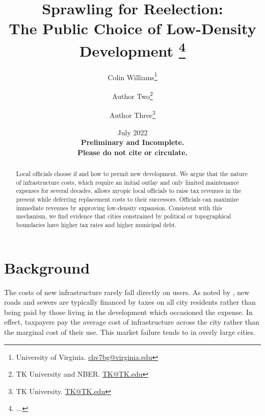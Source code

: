 \documentclass[12pt]{article}
\title{ \vspace*{-2.5cm} \hspace*{-0.5cm}Sprawling for Reelection: \\ The Public Choice of Low-Density Development \footnote{
...
}}
\author{Colin Williams\thanks{University of Virginia.
\href{mailto:chv7bg@virginia.edu}{chv7bg@virginia.edu}} \and Author Two\thanks{TK University and
NBER.  \href{mailto:TK@TK.edu}{TK@TK.edu}} \and Author Three\thanks{TK
University. \href{mailto:TK@TK.edu}{TK@TK.edu}}}
\date{ \vspace*{0.5cm} July 2022 \\
\textbf{Preliminary and Incomplete. \\ Please do not cite or circulate.}
}
\begin{document}
\bgroup
\let\footnoterule\relax

\begin{singlespace}
\maketitle


\begin{abstract}
    \noindent Local officials choose if and how to permit new development. We argue that the nature of infrastructure costs, which require an initial outlay and only limited maintenance expenses for several decades, allows myopic local officials to raise tax revenues in the present while deferring replacement costs to their successors. Officials can maximize immediate revenues by approving low-density expansion. Consistent with this mechanism, we find evidence that cities constrained by political or topographical boundaries have higher tax rates and higher municipal debt.
\end{abstract}
\end{singlespace}
\thispagestyle{empty}

\clearpage
\egroup
\setcounter{page}{1}



\noindent %


\section{Background \label{sec:background}}

The costs of new infrastructure rarely fall directly on users. As noted by \citet{brueckner2000urban}, new roads and sewers are typically financed by taxes on all city residents rather than being paid by those living in the development which occasioned the expense. In effect, taxpayers pay the average cost of infrastructure across the city rather than the marginal cost of their use. This market failure tends to  in overly large cities.
\end{document}
